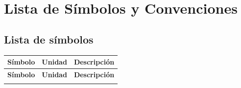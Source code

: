 \newpage
\chapter*{Lista de Símbolos y Convenciones}
\vspace{3\baselineskip}

\section*{Lista de símbolos}

\begin{xltabular}{\linewidth}{llX}
    \toprule
    \textbf{Símbolo} & \textbf{Unidad} & \textbf{Descripción} \\
    \midrule
    \endfirsthead

    \toprule
    \textbf{Símbolo} & \textbf{Unidad} & \textbf{Descripción} \\
    \midrule
    \endhead

    \midrule
    \endfoot

    \bottomrule
    \endlastfoot


\end{xltabular}
